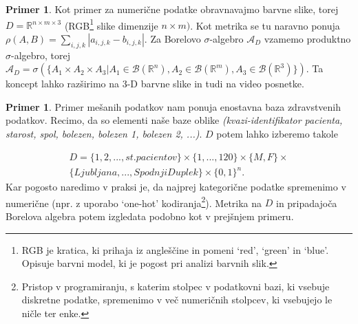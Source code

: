 \documentclass[12pt,a4paper]{amsart}
\theoremstyle{definition} %
\newtheorem{primer}[definicija]{Primer}
\theoremstyle{plain} %
\begin{document}
\begin{primer} Kot primer za numerične podatke obravnavajmo barvne slike, torej $D = \mathbb{R}^{n\times m \times 3}$ (RGB\footnote{RGB je kratica, ki prihaja iz angleščine in pomeni `red', `green' in `blue'. Opisuje barvni model, ki je pogost pri analizi barvnih slik.}  slike dimenzije $n \times m)$. Kot metrika se tu naravno ponuja $\rho(A,B)=\sum_{i,j,k}  |a_{i,j,k}-b_{i,j,k}|$. Za Borelovo $\sigma$-algebro $\mathcal{A}_{D}$  vzamemo produktno $\sigma$-algebro, torej  $\mathcal{A}_{D}=\sigma(\{A_{1} \times A_{2} \times A_{3} | A_{1} \in \mathcal{B}(\mathbb{R}^n),  A_{2} \in \mathcal{B}(\mathbb{R}^m),  A_{3} \in \mathcal{B}(\mathbb{R}^3) \})$. Ta koncept lahko razširimo na 3-D barvne slike in tudi na video posnetke.
\end{primer}

\begin{primer} Primer mešanih podatkov nam ponuja enostavna baza zdravstvenih podatkov. Recimo, da so elementi naše baze oblike \textit{(kvazi-identifikator pacienta, starost, spol, bolezen, bolezen 1, bolezen 2, ...)}. $D$ potem lahko izberemo takole 

\begin{gather*}
D=\{1,2,...,st. pacientov\} \times \{1,...,120\} \times \{M,F\} \times \\
\{Ljubljana, ... , Spodnji Duplek\} \times \{0,1\}^n.
\end{gather*}
Kar pogosto naredimo v praksi je, da najprej kategorične podatke spremenimo v numerične (npr. z uporabo `one-hot' kodiranja\footnote{Pristop v programiranju, s katerim stolpec v podatkovni bazi, ki vsebuje diskretne podatke, spremenimo v več numeričnih stolpcev, ki vsebujejo le ničle ter enke.}). Metrika na $D$ in pripadajoča Borelova algebra potem izgledata podobno kot v prejšnjem primeru.
\end{primer}
\end{document}
